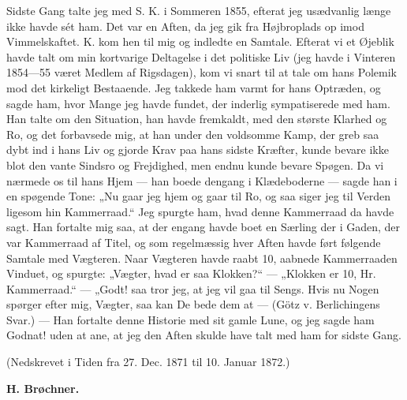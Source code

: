 \documentclass[12pt,a4paper,openany]{book}
\newcommand{\opage}[1]{\marginnote{\footnotesize\textit{[#1]}}}
\begin{document}
Sidste Gang talte jeg med S. K. i Sommeren 1855, efterat jeg usædvanlig længe
ikke havde sét ham. Det var en Aften, da jeg gik fra Højbroplads op imod
Vimmelskaftet. K. kom hen til mig og indledte en Samtale. Efterat vi et
Øjeblik havde talt om min kortvarige Deltagelse i det politiske Liv (jeg
havde i Vinteren 1854---55 været Medlem af Rigsdagen), kom vi snart til at
tale om hans Polemik mod det kirkeligt Bestaaende. Jeg takkede ham varmt for
hans Optræden, og sagde ham, hvor Mange jeg havde fundet, der inderlig
sympatiserede med ham. Han talte om den Situation, han havde fremkaldt, med den
største Klarhed og Ro, og det forbavsede mig, at han under den voldsomme Kamp,
der greb saa dybt ind i hans Liv og gjorde Krav paa hans sidste Kræfter, kunde
bevare ikke blot den vante Sindsro og Frejdighed, men endnu kunde bevare
Spøgen. Da vi nærmede os til hans Hjem --- han boede dengang i Klædeboderne ---
sagde han i en spøgende Tone: „Nu gaar jeg hjem og gaar til Ro, og saa siger
jeg til Verden ligesom hin Kammerraad.“ Jeg spurgte ham, hvad denne Kammerraad
da havde sagt. Han fortalte mig saa, at der engang havde boet en Særling der i
Gaden, der var Kammerraad af Titel, og som regelmæssig hver Aften
\opage{374}havde ført følgende Samtale med Vægteren. Naar Vægteren havde raabt
10, aabnede Kammerraaden Vinduet, og spurgte: „Vægter, hvad er saa Klokken?“
--- „Klokken er 10, Hr. Kammerraad.“ --- „Godt! saa tror jeg, at jeg vil gaa
til Sengs. Hvis nu Nogen spørger efter mig, Vægter, saa kan De bede dem at ---
(Götz v. Berlichingens Svar.) --- Han fortalte denne Historie med sit gamle
Lune, og jeg sagde ham Godnat! uden at ane, at jeg den Aften skulde have talt
med ham for sidste Gang.

\begin{center}\small (Nedskrevet i Tiden fra 27. Dec. 1871 til 10. Januar 1872.)\end{center}

\begin{flushright}\textbf{H. Brøchner.}\end{flushright}

\end{document}
